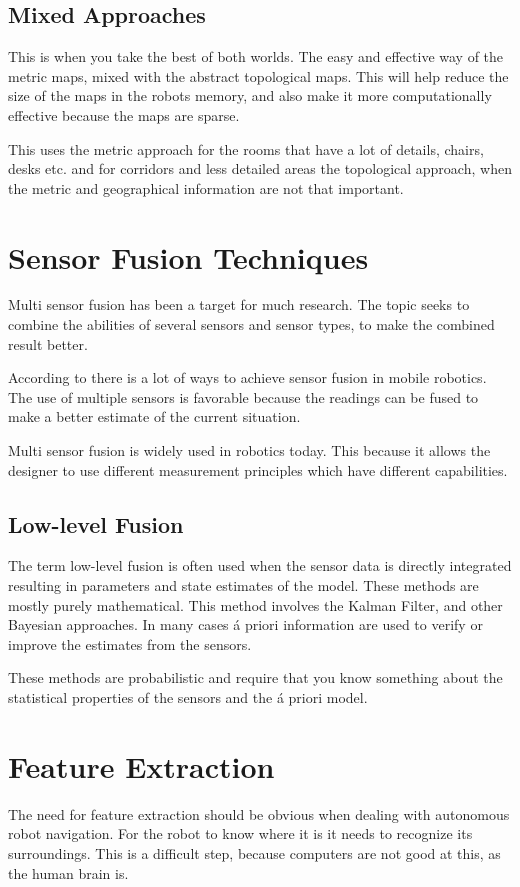 \subsection{Mixed Approaches}
This is when you take the best of both worlds. The easy and effective way of the metric
maps, mixed with the abstract topological maps. This will help reduce the size of
the maps in the robots memory, and also make it more computationally effective because the
maps are sparse. 

This uses 
the metric approach for the rooms that have a lot of details, chairs, desks etc. and for
corridors and less detailed areas the topological approach, when the metric and
geographical information are not that important. 
\cite{thrun}

\section{Sensor Fusion Techniques}
Multi sensor fusion has been a target for much research. The topic seeks to combine the
abilities of several sensors and sensor types, to make the combined result better. 


According to \cite{sensor-fusion-mobile-robots} there is a lot of ways to achieve sensor
fusion in mobile robotics. The use of multiple sensors is favorable because the readings
can be fused to make a better estimate of the current situation. 

Multi sensor fusion is widely used in robotics today. This because it allows the designer
to use different measurement principles which have different capabilities. 


\subsection{Low-level Fusion}
The term low-level fusion is often used when the sensor data is directly integrated
resulting in parameters and state estimates of the model. These methods are mostly purely
mathematical. This method involves the Kalman Filter, and other Bayesian approaches. In
many cases \'a priori information are used to verify or improve the
estimates from the sensors.

These methods are probabilistic and require that you know something about the
statistical properties of the sensors and the \'a priori model. 



\section{Feature Extraction}
\label{chap2:sec-feature-extraction}
The need for feature extraction should be obvious when dealing with autonomous robot
navigation. For the robot to know where it is it needs to recognize its surroundings. This
is a difficult step, because computers are not good at this, as the human
brain is. 

